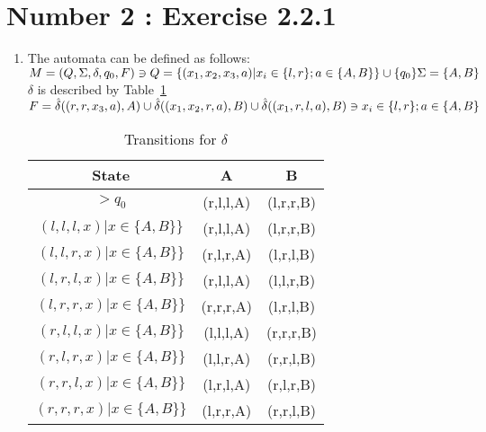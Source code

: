 \documentclass[12pt,a4paper,twoside]{article}  %
\begin{document}
\section{Number 2 : Exercise 2.2.1}
\begin{enumerate}

\item The automata can be defined as follows: \\
 $M = (Q, \Sigma, \delta, q_0, F) \ni \\
  Q = \{(x_1, x_2, x_3, a) | x_i \in \{l,r\}; a \in \{A,B\}\} \cup \{q_0\} \\
  \Sigma = \{A,B\}$ \\
 $\delta$ is described by Table~\ref{2.2.1.a} \\
 $F = \hat \delta((r,r,x_3,a), A) \cup \hat \delta((x_1,x_2,r,a), B) \cup
  \hat \delta((x_1,r,l,a), B) \\
  \ni x_i \in \{l,r\}; a \in \{A,B\}$

\begin{table}
\begin{tabular}{c || c | c }
State                             &A           &B         \\
\hline\hline
$>q_0$                            &(r,l,l,A)   &(l,r,r,B) \\
$(l,l,l,x) | x \in \{A,B\}\}$     &(r,l,l,A)   &(l,r,r,B) \\
$(l,l,r,x) | x \in \{A,B\}\}$     &(r,l,r,A)   &(l,r,l,B) \\
$(l,r,l,x) | x \in \{A,B\}\}$     &(r,l,l,A)   &(l,l,r,B) \\
$(l,r,r,x) | x \in \{A,B\}\}$     &(r,r,r,A)   &(l,r,l,B) \\
$(r,l,l,x) | x \in \{A,B\}\}$     &(l,l,l,A)   &(r,r,r,B) \\
$(r,l,r,x) | x \in \{A,B\}\}$     &(l,l,r,A)   &(r,r,l,B) \\
$(r,r,l,x) | x \in \{A,B\}\}$     &(l,r,l,A)   &(r,l,r,B) \\
$(r,r,r,x) | x \in \{A,B\}\}$     &(l,r,r,A)   &(r,r,l,B)
\end{tabular}
\caption{Transitions for $\delta$}\label{2.2.1.a}
\end{table}
\end{enumerate}
\end{document}
